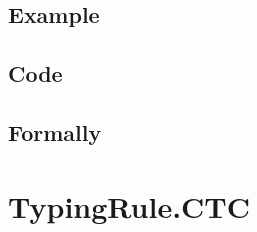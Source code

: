 \documentclass{book}
\begin{document}
  \subsection{Example}

  \subsection{Code}

\begin{emptyformal}
    \subsection{Formally}
\end{emptyformal}


\section{TypingRule.CTC \label{sec:TypingRule.CTC}}
\end{document}
